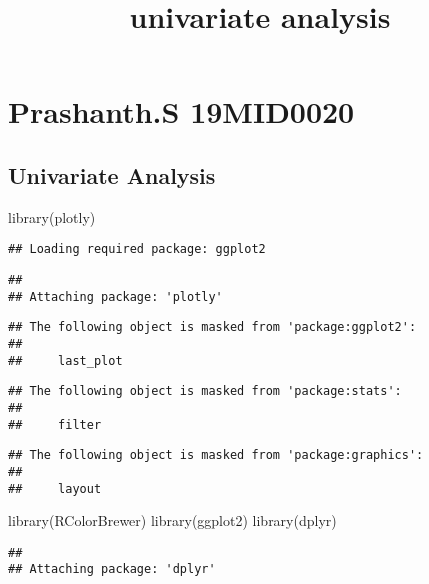 \documentclass[
]{article}
\title{univariate analysis}
\author{}
\date{\vspace{-2.5em}}
\newenvironment{Shaded}{\begin{snugshade}}{\end{snugshade}}
\newcommand{\FunctionTok}[1]{\textcolor[rgb]{0.00,0.00,0.00}{#1}}
\newcommand{\NormalTok}[1]{#1}
\begin{document}
\maketitle

\hypertarget{prashanth.s-19mid0020}{%
\section{Prashanth.S 19MID0020}\label{prashanth.s-19mid0020}}

\hypertarget{univariate-analysis}{%
\subsection{Univariate Analysis}\label{univariate-analysis}}

\begin{Shaded}
\begin{Highlighting}[]
\FunctionTok{library}\NormalTok{(plotly)}
\end{Highlighting}
\end{Shaded}

\begin{verbatim}
## Loading required package: ggplot2
\end{verbatim}

\begin{verbatim}
## 
## Attaching package: 'plotly'
\end{verbatim}

\begin{verbatim}
## The following object is masked from 'package:ggplot2':
## 
##     last_plot
\end{verbatim}

\begin{verbatim}
## The following object is masked from 'package:stats':
## 
##     filter
\end{verbatim}

\begin{verbatim}
## The following object is masked from 'package:graphics':
## 
##     layout
\end{verbatim}

\begin{Shaded}
\begin{Highlighting}[]
\FunctionTok{library}\NormalTok{(RColorBrewer)}
\FunctionTok{library}\NormalTok{(ggplot2)}
\FunctionTok{library}\NormalTok{(dplyr)}
\end{Highlighting}
\end{Shaded}

\begin{verbatim}
## 
## Attaching package: 'dplyr'
\end{verbatim}
\end{document}
